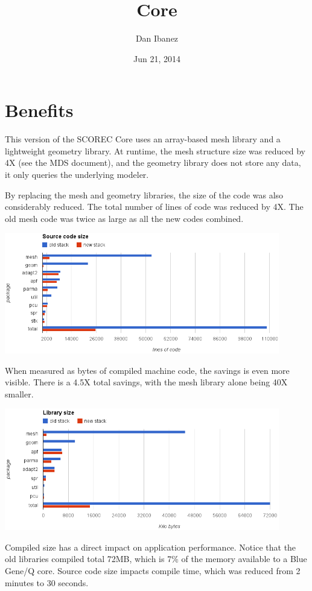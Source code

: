 \documentclass{article}
\begin{document}
\title{Core}
\author{Dan Ibanez}
\date{Jun 21, 2014}
\maketitle
\section{Benefits}

This version of the SCOREC Core uses an array-based mesh
library and a lightweight geometry library.
At runtime, the mesh structure size was reduced by 4X
(see the MDS document), and the geometry library does
not store any data, it only queries the underlying modeler.

By replacing the mesh and geometry libraries,
the size of the code was also considerably reduced.
The total number of lines of code was reduced by 4X.
The old mesh code was twice as large as all the new
codes combined.

\includegraphics[width=0.9\textwidth]{loc.png}

When measured as bytes of compiled machine code, the savings
is even more visible.
There is a 4.5X total savings, with the mesh library alone being 40X
smaller.

\includegraphics[width=0.9\textwidth]{libsize.png}

Compiled size has a direct impact on application performance.
Notice that the old libraries compiled total 72MB, which
is 7\% of the memory available to a Blue Gene/Q core.
Source code size impacts compile time, which was reduced from
2 minutes to 30 seconds.
\end{document}
